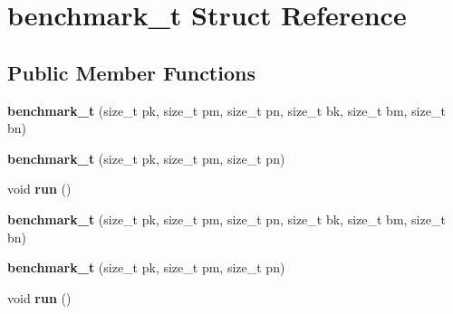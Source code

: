 \hypertarget{structbenchmark__t}{}\section{benchmark\+\_\+t Struct Reference}
\label{structbenchmark__t}
\subsection*{Public Member Functions}
\begin{DoxyCompactItemize}
\item 
\mbox{\label{structbenchmark__t_a69841f60740411ff914ada0a80e2d784}} 
{\bfseries benchmark\+\_\+t} (size\+\_\+t pk, size\+\_\+t pm, size\+\_\+t pn, size\+\_\+t bk, size\+\_\+t bm, size\+\_\+t bn)
\item 
\mbox{\label{structbenchmark__t_a31a073046d41c7f4064b5c2cf1f0d986}} 
{\bfseries benchmark\+\_\+t} (size\+\_\+t pk, size\+\_\+t pm, size\+\_\+t pn)
\item 
\mbox{\label{structbenchmark__t_acf9ace0a89b40995ccc7f03680e6102c}} 
void {\bfseries run} ()
\item 
\mbox{\label{structbenchmark__t_a69841f60740411ff914ada0a80e2d784}} 
{\bfseries benchmark\+\_\+t} (size\+\_\+t pk, size\+\_\+t pm, size\+\_\+t pn, size\+\_\+t bk, size\+\_\+t bm, size\+\_\+t bn)
\item 
\mbox{\label{structbenchmark__t_a31a073046d41c7f4064b5c2cf1f0d986}} 
{\bfseries benchmark\+\_\+t} (size\+\_\+t pk, size\+\_\+t pm, size\+\_\+t pn)
\item 
\mbox{\label{structbenchmark__t_acf9ace0a89b40995ccc7f03680e6102c}} 
void {\bfseries run} ()
\end{DoxyCompactItemize}
